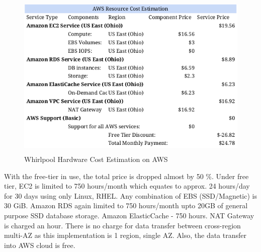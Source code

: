 \begin{figure}[h!]
  \centering
  \includegraphics[width=12cm,height=8cm,keepaspectratio]{../media/crawler/aws-resource-cost-estimation.png}
  \caption{Whirlpool Hardware Cost Estimation on AWS}
  \label{fig:awscost}
\end{figure}

\noindent
With the free-tier in use, the total price is dropped almost by 50 \%. Under free tier, EC2 is limited to 750 hours/month which equates to approx. 24 hours/day for 30 days using only Linux, RHEL. Any combination of EBS (SSD/Magnetic) is 30 GiB. Amazon RDS again limited to 750 hours/month upto 20GB of general purpose SSD database
storage. Amazon ElasticCache - 750 hours. NAT Gateway is charged  an hour. There is no charge for data transfer between cross-region multi-AZ as this implementation is 1 region, single AZ. Also, the data 
transfer into AWS cloud is free.

\pagebreak